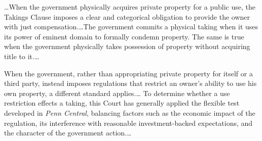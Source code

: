 




\ldots When the government physically acquires private property for a public
use, the Takings Clause imposes a clear and categorical obligation to provide
the owner with just compensation.\ldots The government commits a physical taking
when it uses its power of eminent domain to formally condemn property. The same
is true when the government physically takes possession of property without
acquiring title to it.\ldots


When the government, rather than appropriating private property for itself or a
third party, instead imposes regulations that restrict an owner's ability to use
his own property, a different standard applies.\ldots
To
determine whether a use restriction effects a taking, this Court has generally
applied the flexible test developed in \textit{Penn Central}, balancing factors
such as the economic impact of the regulation, its interference with reasonable
investment-backed expectations, and the character of the government
action.\ldots


